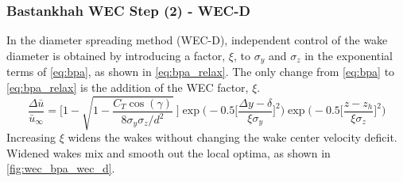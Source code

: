 \documentclass[journal abbreviation, manuscript]{copernicus}
\begin{document}
	\subsubsection{Bastankhah WEC Step (2) - WEC-D}
	In the diameter spreading method (WEC-D), independent control of the wake diameter is obtained by introducing a factor, $\xi$, to $\sigma_y$ and $\sigma_z$ in the exponential terms of \ref{eq:bpa}, as shown in \ref{eq:bpa_relax}. The only change from \ref{eq:bpa} to \ref{eq:bpa_relax} is the addition of the WEC factor, $\xi$.
	\begin{equation}
		\frac{\Delta \bar{u}}{\bar{u}_{\infty}} = \Bigg[1-\sqrt{1-\frac{C_T \cos{(\gamma)}}{8 \sigma_y \sigma_z/d^2}}~\Bigg] \exp{\bigg(-0.5\Big[\frac{\Delta y-\delta}{\xi \sigma_y}\Big]^2\bigg)}\exp{\bigg(-0.5\Big[\frac{z-z_h}{\xi \sigma_z}\Big]^2\bigg)}
		\label{eq:bpa_relax}
	\end{equation}
	Increasing $\xi$ widens the wakes without changing the wake center velocity deficit. Widened wakes mix and smooth out the local optima, as shown in \ref{fig:wec_bpa_wec_d}. 
\end{document}
